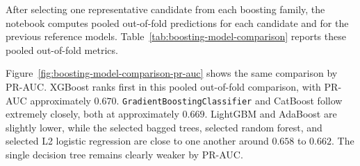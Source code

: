 After selecting one representative candidate from each boosting family, the notebook computes pooled out-of-fold predictions for each candidate and for the previous reference models. Table~\ref{tab:boosting-model-comparison} reports these pooled out-of-fold metrics.

\begin{table}[H]
\centering
\small
{}
\caption{Pooled out-of-fold comparison of selected boosting candidates and reference models}
\label{tab:boosting-model-comparison}
\end{table}

Figure~\ref{fig:boosting-model-comparison-pr-auc} shows the same comparison by PR-AUC. XGBoost ranks first in this pooled out-of-fold comparison, with PR-AUC approximately \(0.670\). \texttt{GradientBoostingClassifier} and CatBoost follow extremely closely, both at approximately \(0.669\). LightGBM and AdaBoost are slightly lower, while the selected bagged trees, selected random forest, and selected L2 logistic regression are close to one another around \(0.658\) to \(0.662\). The single decision tree remains clearly weaker by PR-AUC.

